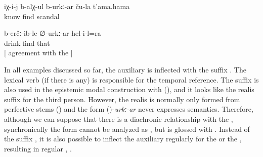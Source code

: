 \begin{exe}
	\ex	\label{ex:He probably knows their scandal@19}
	\gll	iχ-i-j	b-alχ-ul	b-urkː-ar	ču-la	t'ama.hama\\
			know	find		scandal\\
	\glt	{}

	\ex	\label{ex:He also drank probably agreement with ergative@18}
	\gll	b-erčː-ib-le	∅-urkː-ar	hel-i-l=ra\\
		drink	find		that\\
	\glt	{} [ agreement with the ]
\end{exe}

In all examples discussed so far, the auxiliary is inflected with the suffix  . The lexical verb (if there is any) is responsible for the temporal reference. The suffix  is also used in the epistemic modal construction with  (), and it looks like the realis  suffix for the third person. However, the realis  is normally only formed from perfective stems () and the form ()-\textit{urkː-ar} never expresses  semantics. Therefore, although we can suppose that there is a diachronic relationship with the , synchronically the form cannot be analyzed as , but is glossed with . Instead of the suffix , it is also possible to inflect the auxiliary regularly for the   or the , resulting in regular   , .

